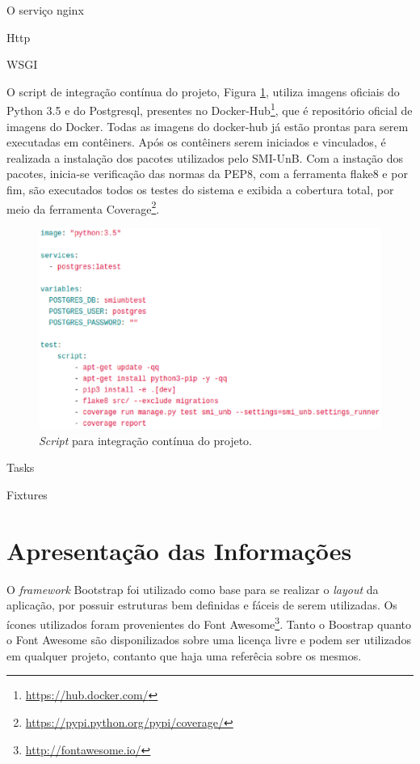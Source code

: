 O serviço nginx

Http

WSGI

O script de integração contínua do projeto, Figura \ref{integracao}, utiliza imagens oficiais do Python 3.5 e do Postgresql, presentes no Docker-Hub\footnote{\url{https://hub.docker.com/}}, que é repositório oficial de imagens do Docker. Todas as imagens do docker-hub já estão prontas para serem executadas em contêiners. Após os contêiners serem iniciados e vinculados, é realizada a instalação dos pacotes utilizados pelo SMI-UnB. Com a instação dos pacotes, inicia-se verificação das normas da PEP8, com a ferramenta flake8 e por fim, são executados todos os testes do sistema e exibida a cobertura total, por meio da ferramenta Coverage\footnote{\url{https://pypi.python.org/pypi/coverage/}}.

\begin{figure}[!h]
    \centering
    \includegraphics[keepaspectratio=true,scale=0.65]{figuras/integracao.eps}
    \caption{\textit{Script} para integração contínua do projeto.}
    \label{integracao}
\end{figure}

Tasks

Fixtures

\section{Apresentação das Informações}
O \textit{framework} Bootstrap foi utilizado como base para se realizar o \textit{layout} da aplicação, por possuir estruturas bem definidas e fáceis de serem utilizadas. Os ícones utilizados foram provenientes do Font Awesome\footnote{\url{http://fontawesome.io/}}. Tanto o Boostrap quanto o Font Awesome são disponilizados sobre uma licença livre e podem ser utilizados em qualquer projeto, contanto que haja uma referêcia sobre os mesmos.

